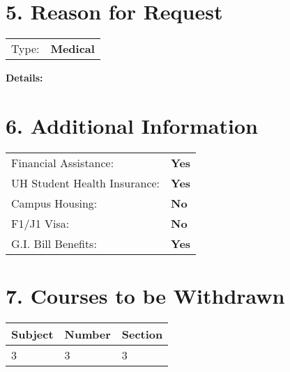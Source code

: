 \documentclass[12pt]{article}
\begin{document}
\vspace{0.5cm}

\section*{5. Reason for Request}
\begin{tabular}{ll}
Type: & \textbf{Medical} \\
\end{tabular}

\noindent\textbf{Details:}\\

\vspace{0.5cm}

\section*{6. Additional Information}
\begin{tabular}{ll}
Financial Assistance: & \textbf{Yes} \\
UH Student Health Insurance: & \textbf{Yes} \\
Campus Housing: & \textbf{No} \\
F1/J1 Visa: & \textbf{No} \\
G.I. Bill Benefits: & \textbf{Yes} \\
\end{tabular}

\vspace{0.5cm}

\section*{7. Courses to be Withdrawn}
\begin{tabular}{lll}
\textbf{Subject} & \textbf{Number} & \textbf{Section} \\
\hline
3 & 3 & 3 \\

\end{tabular}

\vspace{0.5cm}
\end{document}
